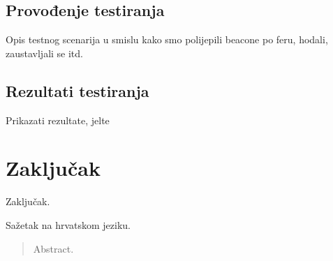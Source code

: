 \documentclass[times, utf8, diplomski, numeric]{fer}
\begin{document}
\section{Provođenje testiranja}
Opis testnog scenarija u smislu kako smo polijepili beacone po feru, hodali,
zaustavljali se itd.
\section{Rezultati testiranja}
Prikazati rezultate, jelte

\chapter{Zaključak}
Zaključak.




\begin{sazetak}
Sažetak na hrvatskom jeziku.

\end{sazetak}

\begin{abstract}
Abstract.

\end{abstract}
\end{document}
